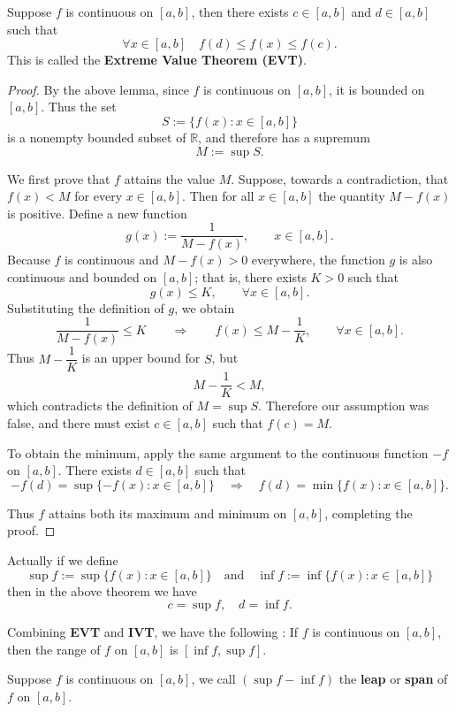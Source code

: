 \documentclass[a4paper]{ctexart}
\begin{document}
	\begin{mythm}
		Suppose $f$ is continuous on $[a,b]$, then there exists $c\in [a,b]$ and $d\in [a,b]$ such that
		\[
		\forall x \in [a,b] \quad f(d)\le f(x)\le f(c).
		\]
		This is called the \textbf{Extreme Value Theorem (EVT)}.
	\end{mythm}
	\begin{proof}
	By the above lemma, since $f$ is continuous on $[a,b]$, it is bounded on $[a,b]$.
	Thus the set 
	\[
	S := \{f(x): x\in[a,b]\}
	\]
	is a nonempty bounded subset of $\mathbb{R}$, and therefore has a supremum
	\[
	M := \sup S.
	\]

	We first prove that $f$ attains the value $M$. Suppose, towards a contradiction,
	that $f(x)<M$ for every $x\in[a,b]$. Then for all $x\in[a,b]$ the quantity
	$M-f(x)$ is positive. Define a new function
	\[
	g(x):=\frac{1}{M-f(x)},\qquad x\in[a,b].
	\]
	Because $f$ is continuous and $M-f(x)>0$ everywhere, the function $g$ is also continuous and bounded on $[a,b]$; that is,
	there exists $K>0$ such that
	\[
	g(x)\le K,\qquad \forall x\in[a,b].
	\]
	Substituting the definition of $g$, we obtain
	\[
	\frac{1}{M-f(x)}\le K
	\qquad\Longrightarrow\qquad
	f(x)\le M-\frac{1}{K},\qquad \forall x\in[a,b].
	\]
	Thus $M-\dfrac{1}{K}$ is an upper bound for $S$, but 
	\[
	M-\frac{1}{K}<M,
	\]
	which contradicts the definition of $M=\sup S$. Therefore our assumption was 
	false, and there must exist $c\in[a,b]$ such that $f(c)=M$.

	To obtain the minimum, apply the same argument to the continuous function 
	$-f$ on $[a,b]$. There exists $d\in[a,b]$ such that
	\[
	-f(d)=\sup\{-f(x):x\in[a,b]\}
	\quad\Longrightarrow\quad
	f(d)=\min\{f(x):x\in[a,b]\}.
	\]

	Thus $f$ attains both its maximum and minimum on $[a,b]$, completing the proof.
	\end{proof}
	\begin{myrmk}
		Actually if we define 
		\[
		\sup f:=\sup \{f(x):x\in [a,b]\}\quad \text{and} \quad
		\inf f:=\inf \{f(x):x\in [a,b]\}
		\]
		then in the above theorem we have
		\[
		c=\sup f,\quad d=\inf f.
		\]
	\end{myrmk}
	\begin{mypro}
		Combining \textbf{EVT} and \textbf{IVT}, we have the following : If $f$ is continuous on $[a,b]$, then the range of $f$ on $[a,b]$ is $[\inf f, \sup f]$.
	\end{mypro}
	\begin{mydef}
		Suppose $f$ is continuous on $[a,b]$, we call $(\sup f - \inf f)$ the \textbf{leap} or \textbf{span} of $f$ on $[a,b]$.
	\end{mydef}
\end{document}
